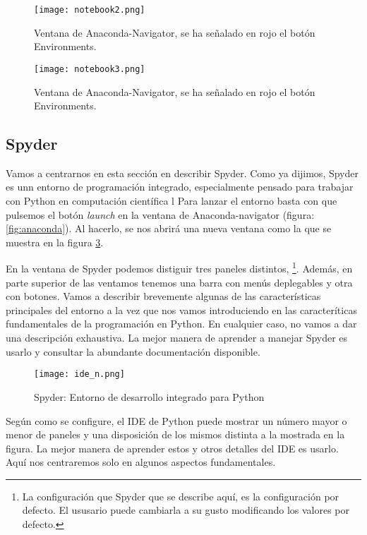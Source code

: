 \begin{figure}
\centering
    \texttt{[image: notebook2.png]}
    \label{fig:ntb2}
    \caption{Ventana de Anaconda-Navigator, se ha señalado en rojo el botón Environments.}
    \end{figure}

\begin{figure}
\centering
    \texttt{[image: notebook3.png]}
    \label{fig:ntb3}
    \caption{Ventana de Anaconda-Navigator, se ha señalado en rojo el botón Environments.}
\end{figure} 


\begin{paracol}{2}
\subsection{Spyder}
Vamos a centrarnos en esta sección en describir Spyder. Como ya dijimos, Spyder es unn entorno de programación integrado, especialmente pensado para trabajar con Python en computación científica l Para lanzar el entorno basta con que pulsemos el botón \emph{launch} en la ventana de Anaconda-navigator (figura: \ref{fig:anaconda}). Al hacerlo, se nos abrirá una nueva ventana como la que se muestra en la figura \ref{fig:ide}.

En la ventana de Spyder podemos distiguir tres paneles distintos, \footnote{La configuración que Spyder que se describe 
 aquí, es la configuración por defecto. El ususario puede cambiarla a su gusto modificando los valores por defecto.}. Además, en parte superior de las ventamos tenemos una barra con menús deplegables y otra con botones. Vamos a describir brevemente algunas de las características principales del entorno a la vez que nos vamos introduciendo en las caracteríticas fundamentales de la programación en Python. En cualquier caso, no vamos a dar una descripción exhaustiva. La mejor manera de aprender a manejar Spyder es usarlo y consultar la abundante documentación disponible.
 
\end{paracol}

\begin{figure}
	\centering
		\texttt{[image: ide\_n.png]}
	\caption{Spyder: Entorno de desarrollo integrado para Python}
	\label{fig:ide}
\end{figure}

Según como se configure, el IDE de Python puede mostrar un número mayor o menor de paneles y una disposición de los mismos distinta a la mostrada en la figura. La mejor manera de aprender estos y otros detalles del IDE es usarlo. Aquí nos centraremos solo en algunos aspectos fundamentales.

